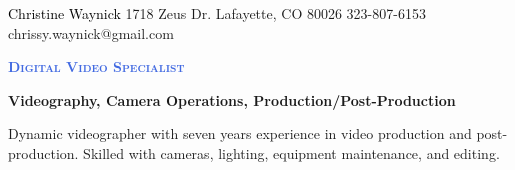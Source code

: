 \documentclass[letterpaper, 11pt]{article}
\newcommand{\CawColorName}{Black}
\newcommand{\CawColorTitle}{RoyalBlue}
\begin{document}
%
\cawtitle
{\textcolor{\CawColorName}{Christine Waynick}}
{1718 Zeus Dr.}
{Lafayette, CO 80026}
{323-807-6153}
{chrissy.waynick@gmail.com}
%
\begin{center}\par\smallskip
\textcolor{\CawColorTitle}{\Large \textbf{\textsc{Digital Video Specialist}}}\par
\large \textbf{{Videography, Camera Operations, Production/Post-Production}}\par
\smallskip
\noindent \begin{minipage}[t]{0.75\textwidth}%
\begin{sloppypar}
Dynamic videographer with seven years experience in video production and
post-production. Skilled with cameras, lighting, equipment maintenance, and editing.
\end{sloppypar}
\end{minipage}
\end{center}
\par \smallskip \smallskip
%
%
\end{document}

